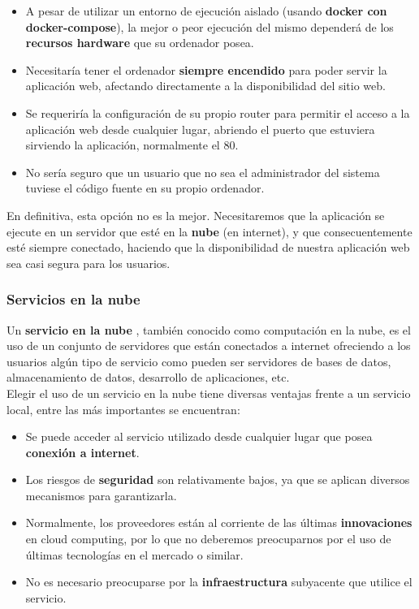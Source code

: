     \begin{itemize}
        \item A pesar de utilizar un entorno de ejecución aislado (usando \textbf{docker
        con docker-compose}), la mejor o peor ejecución del mismo dependerá de los
        \textbf{recursos hardware} que su ordenador posea.
        \item Necesitaría tener el ordenador \textbf{siempre encendido} para poder servir
        la aplicación web, afectando directamente a la disponibilidad del sitio web.
        \item Se requeriría la configuración de su propio router para permitir el acceso
        a la aplicación web desde cualquier lugar, abriendo el puerto que estuviera
        sirviendo la aplicación, normalmente el 80.
        \item No sería seguro que un usuario que no sea el administrador del sistema
        tuviese el código fuente en su propio ordenador.
    \end{itemize}

En definitiva, esta opción no es la mejor. Necesitaremos que la aplicación se ejecute en
un servidor que esté en la \textbf{nube} (en internet), y que consecuentemente esté
siempre conectado, haciendo que la disponibilidad de nuestra aplicación web sea casi
segura para los usuarios. \\

\subsubsection{Servicios en la nube}
Un \textbf{servicio en la nube} \cite{cloud-computing}, también conocido como computación
en la nube, es el uso de un conjunto de servidores que están conectados a internet
ofreciendo a los usuarios algún tipo de servicio como pueden ser servidores de bases de
datos, almacenamiento de datos, desarrollo de aplicaciones, etc. \\

Elegir el uso de un servicio en la nube tiene diversas ventajas frente a un servicio
local, entre las más importantes se encuentran:

    \begin{itemize}
        \item Se puede acceder al servicio utilizado desde cualquier lugar que posea
        \textbf{conexión a internet}.
        \item Los riesgos de \textbf{seguridad} son relativamente bajos, ya que se aplican
        diversos mecanismos para garantizarla.
        \item Normalmente, los proveedores están al corriente de las últimas
        \textbf{innovaciones} en cloud computing, por lo que no deberemos preocuparnos por
        el uso de últimas tecnologías en el mercado o similar.
        \item No es necesario preocuparse por la \textbf{infraestructura} subyacente que
        utilice el servicio.
    \end{itemize}

